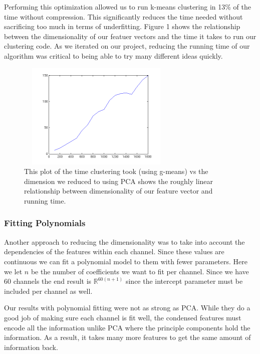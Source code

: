 \documentclass[conference]{IEEEtran}
\begin{document}
Performing this optimization allowed us to run k-means clustering in 13\%
of the time without compression. This significantly reduces the time
needed without sacrificing too much in terms of underfitting. Figure 1
shows the relationship between the dimensionality of our
featuer vectors and the time it takes to run our clustering code. As we
iterated on our project, reducing the running time of our algorithm was
critical to being able to try many different ideas quickly.

\begin{figure}
\centering
\includegraphics[width=3in,height=2in]{../poster/images/dim_vs_runningtime.png} 
\caption{This plot of the time clustering took (using g-means) vs the
  dimension we reduced to using PCA shows the roughly linear relationship 
between dimensionality of our feature vector and running
time.}
\end{figure}

\subsubsection{Fitting Polynomials}

Another approach to reducing the dimensionality was to take
into account the dependencies of the features within each
channel. Since these values are continuous we can fit a
polynomial model to them with fewer parameters. Here we let $n$
be the number of coefficients we want to fit per channel. Since
we have 60 channels the end result is $\mathbb{R}^{60(n+1)}$
since the intercept parameter must be included per channel as well.

Our results with polynomial fitting were not as strong as
PCA. While they do a good job of making sure each channel is
fit well, the condensed features must encode all the
information unlike PCA where the principle components hold the
information. As a result, it takes many more features to get
the same amount of information back.
\end{document}
